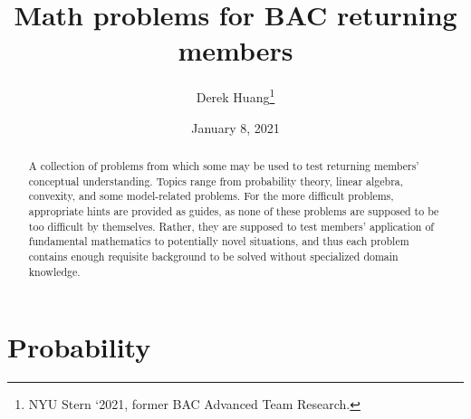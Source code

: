 \documentclass{article}
\title{Math problems for BAC returning members}
\author{Derek Huang\thanks{NYU Stern `2021, former BAC Advanced Team Research.}}
\date{January 8, 2021}
\numberwithin{equation}{section}
\begin{document}
\maketitle

\begin{abstract}
    A collection of problems from which some may be used to test returning
    members' conceptual understanding. Topics range from probability theory,
    linear algebra, convexity, and some model-related problems. For the more
    difficult problems, appropriate hints are provided as guides, as none of
    these problems are supposed to be too difficult by themselves. Rather, they
    are supposed to test members' application of fundamental mathematics to
    potentially novel situations, and thus each problem contains enough
    requisite background to be solved without specialized domain knowledge.
\end{abstract}

\section{Probability}
\end{document}
